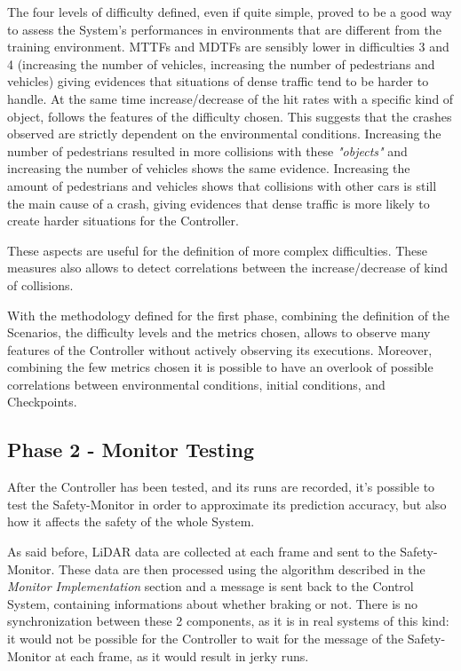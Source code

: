 The four levels of difficulty defined, even if quite simple, proved to be a good way to assess the System's performances in environments that are different from the training environment. MTTFs and MDTFs are sensibly lower in difficulties 3 and 4 (increasing the number of vehicles, increasing the number of pedestrians and vehicles) giving evidences that situations of dense traffic tend to be harder to handle. At the same time increase/decrease of the hit rates with a specific kind of object, follows the features of the difficulty chosen. This suggests that the crashes observed are strictly dependent on the environmental conditions. Increasing the number of pedestrians resulted in more collisions with these \textsl{"objects"} and increasing the number of vehicles shows the same evidence. Increasing the amount of pedestrians and vehicles shows that collisions with other cars is still the main cause of a crash, giving evidences that dense traffic is more likely to create harder situations for the Controller.

These aspects are useful for the definition of more complex difficulties. These measures also allows to detect correlations between the increase/decrease of kind of collisions.\newline

With the methodology defined for the first phase, combining the definition of the Scenarios, the difficulty levels and the metrics chosen, allows to observe many features of the Controller without actively observing its executions. Moreover, combining the few metrics chosen it is possible to have an overlook of possible correlations between environmental conditions, initial conditions, and Checkpoints.




\subsection{Phase 2 - Monitor Testing}

After the Controller has been tested, and its runs are recorded, it's possible to test the Safety-Monitor in order to approximate its prediction accuracy, but also how it affects the safety of the whole System.

As said before, LiDAR data are collected at each frame and sent to the Safety-Monitor. These data are then processed using the algorithm described in the \textsl{Monitor Implementation} section and a message is sent back to the Control System, containing informations about whether braking or not. There is no synchronization between these 2 components, as it is in real systems of this kind: it would not be possible for the Controller to wait for the message of the Safety-Monitor at each frame, as it would result in jerky runs.

